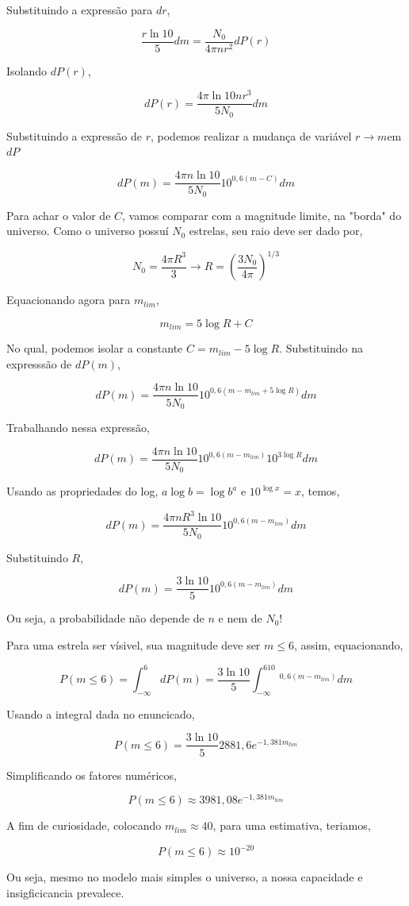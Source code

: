 \documentclass[11pt]{article}
\begin{document}
\begin{pproblem}
\begin{pssolution*}{}{}
\begin{alternativas}
    Substituindo a expressão para \(dr\), 

    \[\frac{r\ln 10}{5}dm = \frac{N_0}{4\pi n r^2}dP(r)\]

    Isolando \(dP(r)\), 

    \[dP(r) = \frac{4\pi \ln 10 n r^3}{5 N_0}dm\]

    Substituindo a expressão de \(r\), podemos realizar a mudança de variável \(r\rightarrow m\)em \(dP\)

    \[dP(m) = \frac{4\pi n \ln 10  }{5 N_0}10^{0,6(m-C)}dm\]

    Para achar o valor de \(C\), vamos comparar com a magnitude limite, na "borda" do universo. Como o universo possuí \(N_0\) estrelas, seu raio deve ser dado por, 

    \[N_0 = \frac{4\pi R^3}{3} \rightarrow R = \left(\frac{3N_0}{4\pi}\right)^{1/3}\]

    Equacionando agora para \(m_{lim}\), 
    
    \[m_{lim} = 5\log R + C\]

    No qual, podemos isolar a constante \(C = m_{lim}-5\log R\). Substituindo na expresssão de \(dP(m)\),

    \[dP(m) = \frac{4\pi n \ln 10  }{5 N_0}10^{0,6(m-m_{lim}+5\log R)}dm\]

    Trabalhando nessa expressão, 

    \[dP(m) = \frac{4\pi n \ln 10  }{5 N_0}10^{0,6(m-m_{lim})}10^{3\log R}dm\]

    Usando as propriedades do log, \(a\log b = \log b^a\) e \(10^{\log x} = x\), temos, 

    \[dP(m) = \frac{4\pi n R^3\ln 10}{5N_0}10^{0,6(m-m_{lim})}dm\]

    Substituindo \(R\), 

    \[\boxed{dP(m) = \frac{3\ln 10}{5}10^{0,6(m-m_{lim})}dm}\]

    Ou seja, a probabilidade não depende de \(n\) e nem de \(N_0\)!

    \item Para uma estrela ser vísivel, sua magnitude deve ser \(m\leq 6\), assim, equacionando, 
    
    \[P(m\leq 6) = \int_{-\infty}^6 dP(m) = \frac{3\ln 10}{5}\int_{-\infty}^610^{0,6(m-m_{lim})}dm\]

    Usando a integral dada no enuncicado, 

    \[P(m\leq 6) = \frac{3\ln 10}{5}2881,6 e^{-1,381 m_{lim}}\]

    Simplificando os fatores numéricos, 

    \[\boxed{P(m\leq 6) \approx 3981,08 e^{-1,381 m_{lim}}} \]

    A fim de curiosidade, colocando \(m_{lim}\approx 40\), para uma estimativa, teriamos, 

    \[P(m\leq 6)\approx 10^{-20}\]

    Ou seja, mesmo no modelo mais simples o universo, a nossa capacidade e insigficicancia prevalece.
    \end{alternativas}

\end{pssolution*}
\end{pproblem}
\end{document}
